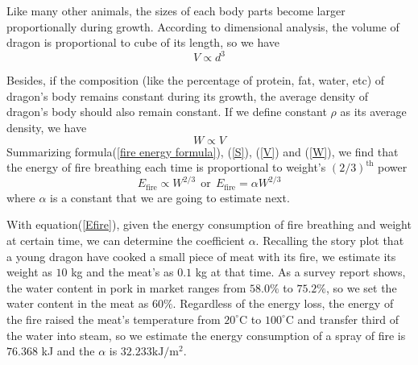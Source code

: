 \documentclass{mcmthesis}
\newcommand{\upcite}[1]{\textsuperscript{\textsuperscript{\cite{#1}}}}
\begin{document}
Like many other animals, the sizes of each body parts become larger proportionally during growth. According to dimensional analysis, the volume of dragon is proportional to cube of its length, so we have
\begin{equation}
\label{V}
V\propto d^3
\end{equation}

Besides, if the composition (like the percentage of protein, fat, water, etc) of dragon's body remains constant during its growth, the average density of dragon's body should also remain constant. If we define constant $\rho$ as its average density, we have
\begin{equation}
\label{W}
W\propto V
\end{equation}
Summarizing formula(\ref{fire energy formula}), (\ref{S}), (\ref{V}) and (\ref{W}), we find that the energy of fire breathing each time is proportional to weight's $(2/3)^{\text{th}}$ power
\begin{equation}
\label{Efire}
E_{\text{fire}}\propto W^{2/3}~~\text{or}~~E_{\text{fire}}=\alpha W^{2/3}
\end{equation}
where $\alpha$ is a constant that we are going to estimate next.

With equation(\ref{Efire}), given the energy consumption of fire breathing and weight at certain time, we can determine the coefficient $\alpha$. Recalling the story plot that a young dragon have cooked a small piece of meat with its fire\upcite{gameofthrones}, we estimate its weight as $10$ kg and the meat's as $0.1$ kg at that time. As a survey report shows, the water content in pork in market ranges from $58.0\%$ to $75.2\%$\upcite{zhang1993porkinvestigation}, so we set the water content in the meat as $60\%$. Regardless of the energy loss, the energy of the fire raised the meat's temperature from $20^{\circ}$C to $100^{\circ}$C and transfer third of the water into steam, so we estimate the energy consumption of a spray of fire is $76.368$ kJ and the $\alpha$ is $32.233 \text{kJ}/\text{m}^2$.
\end{document}
